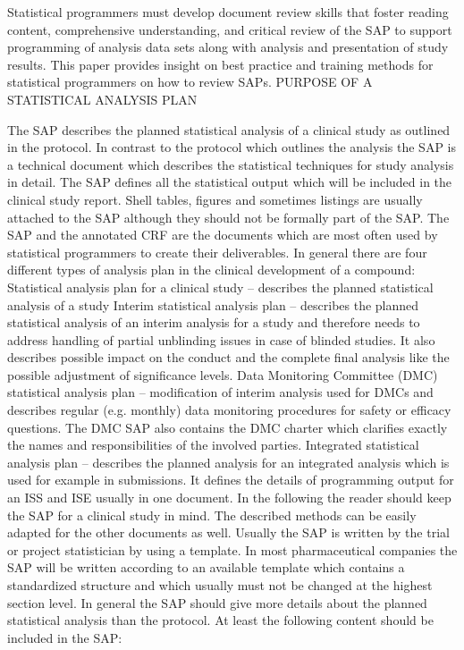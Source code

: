 Statistical programmers must develop document review skills that foster reading content, comprehensive understanding, and critical review of the SAP to support programming of analysis data sets along with analysis and presentation of study results. This paper provides insight on best practice and training methods for statistical programmers on how to review SAPs.
PURPOSE OF A STATISTICAL ANALYSIS PLAN

The SAP describes the planned statistical analysis of a clinical study as outlined in the protocol. In contrast to the protocol which outlines the analysis the SAP is a technical document which describes the statistical techniques for study analysis in detail. The SAP defines all the statistical output which will be included in the clinical study report. Shell tables, figures and sometimes listings are usually attached to the SAP although they should not be formally part of the SAP. The SAP and the annotated CRF are the documents which are most often used by statistical programmers to create their deliverables. In general there are four different types of analysis plan in the clinical development of a compound:
Statistical analysis plan for a clinical study – describes the planned statistical analysis of a study
Interim statistical analysis plan – describes the planned statistical analysis of an interim analysis for a study and therefore needs to address handling of partial unblinding issues in case of blinded studies. It also describes possible impact on the conduct and the complete final analysis like the possible adjustment of significance levels.
Data Monitoring Committee (DMC) statistical analysis plan – modification of interim analysis used for DMCs and describes regular (e.g. monthly) data monitoring procedures for safety or efficacy questions. The DMC SAP also contains the DMC charter which clarifies exactly the names and responsibilities of the involved parties.
Integrated statistical analysis plan – describes the planned analysis for an integrated analysis which is used for example in submissions. It defines the details of programming output for an ISS and ISE usually in one document.
In the following the reader should keep the SAP for a clinical study in mind. The described methods can be easily adapted for the other documents as well. Usually the SAP is written by the trial or project statistician by using a template. In most pharmaceutical companies the SAP will be written according to an available template which contains a standardized structure and which usually must not be changed at the highest section level. In general the SAP should give more details about the planned statistical analysis than the protocol. At least the following content should be included in the SAP:
